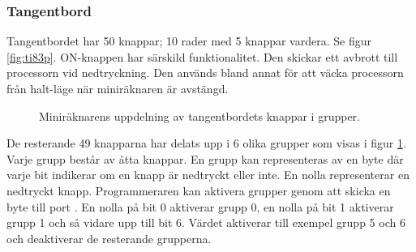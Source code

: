 \documentclass[main.tex]{subfiles}
\begin{document}
\subsubsection{Tangentbord}
\label{theory:kbd}
Tangentbordet har 50 knappar; 10 rader med 5 knappar vardera. Se figur
\ref{fig:ti83p}. ON-knappen har särskild funktionalitet. Den skickar ett
avbrott till processorn vid nedtryckning. Den används bland annat för att väcka
processorn från halt-läge när miniräknaren är avstängd.

\begin{figure}
    \center
    \caption{Miniräknarens uppdelning av tangentbordets knappar i grupper.}
    \label{fig:keygroups}
\end{figure}

De resterande 49 knapparna har delats upp i 6 olika grupper som visas i figur
\ref{fig:keygroups}. Varje grupp består av åtta knappar. En grupp kan
representeras av en byte där varje bit indikerar om en knapp är nedtryckt eller
inte. En nolla representerar en nedtryckt knapp. Programmeraren kan aktivera
grupper genom att skicka en byte till port . En nolla på bit 0
aktiverar grupp 0, en nolla på bit 1 aktiverar grupp 1 och så vidare upp till
bit 6. Värdet  aktiverar till exempel grupp 5 och 6 och
deaktiverar de resterande grupperna.
\end{document}
